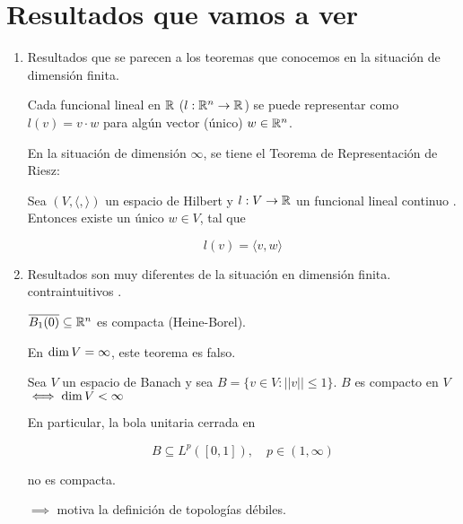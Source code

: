 \documentclass[../Apunte.tex]{subfiles}
\begin{document}
\section{Resultados que vamos a ver}

\begin{enumerate}
    \item Resultados que se parecen a los teoremas que conocemos en la situación de dimensión finita.

    \begin{fexample}
        Cada funcional lineal en $\mathbb{R}$ ($l:\mathbb{R}^{n}\to \mathbb{R}$) se puede representar como $l(v)=v\cdot w$ para algún vector (único) $w\in\mathbb{R}^n$.

    En la situación de dimensión $\infty$, se tiene el Teorema de Representación de Riesz:

    \begin{ftheorem}
        Sea $(V,\langle,\rangle)$ un espacio de Hilbert y $l:V\to \mathbb{R}$ un funcional lineal \color{red}continuo \color{black}. Entonces existe un único $w\in V$, tal que

        \[l(v)=\langle v,w\rangle\]
    \end{ftheorem}
    \end{fexample}

    \item Resultados son muy diferentes de la situación en dimensión finita. \color{red} contraintuitivos \color{black}.

    \begin{fexample}
        $\overline{B_1(0)}\subseteq \mathbb{R}^n$ es compacta (Heine-Borel). 

        En $\operatorname{dim} V=\infty$, este teorema es falso.
    \end{fexample}
    
    \begin{fproposition}
        Sea $V$ un espacio de Banach y sea $B=\{v\in V:||v||\leq 1\}$. $B$ es compacto en $V$ $\iff \operatorname{dim} V<\infty$
    \end{fproposition}

    \begin{fexample}
        En particular, la bola unitaria cerrada en

        \[B\subseteq L^p([0,1]),\quad p\in (1,\infty)\]

        no es compacta.

        \color{blue}$\implies$ motiva la definición de \color{red} topologías débiles.
    \end{fexample}
    
\end{enumerate}
\end{document}
